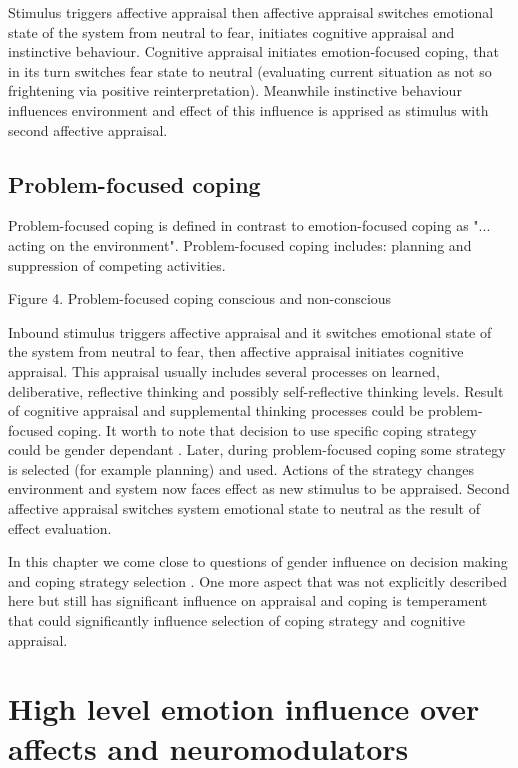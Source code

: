 Stimulus triggers affective appraisal then affective appraisal switches emotional state of the system from neutral to fear, initiates cognitive appraisal and instinctive behaviour. Cognitive appraisal initiates emotion-focused coping, that in its turn switches fear state to neutral (evaluating current situation as not so frightening via positive reinterpretation). Meanwhile instinctive behaviour influences environment and effect of this influence is apprised as stimulus with second affective appraisal.

\subsection{Problem-focused coping}

Problem-focused coping is defined in contrast to emotion-focused coping as "... acting on the environment". Problem-focused coping includes: planning and suppression of competing activities.

\begin{enumerate}
Figure 4. Problem-focused coping conscious and non-conscious
\end{enumerate}

Inbound stimulus triggers affective appraisal and it switches emotional state of the system from neutral to fear, then affective appraisal initiates cognitive appraisal. This appraisal usually includes several processes on learned, deliberative, reflective thinking and possibly self-reflective thinking levels. Result of cognitive appraisal and supplemental thinking processes could be problem-focused coping. It worth to note that decision to use specific coping strategy could be gender dependant \cite{sex_differencies}. Later, during problem-focused coping some strategy is selected (for example planning) and used. Actions of the strategy changes environment and system now faces effect as new stimulus to be appraised. Second affective appraisal switches system emotional state to neutral as the result of effect evaluation.

In this chapter we come close to questions of gender influence on decision making and coping strategy selection \cite{sex_differencies}. One more aspect that was not explicitly described here but still has significant influence on appraisal and coping is temperament that could significantly influence selection of coping strategy and cognitive appraisal.

\section{High level emotion influence over affects and neuromodulators}

